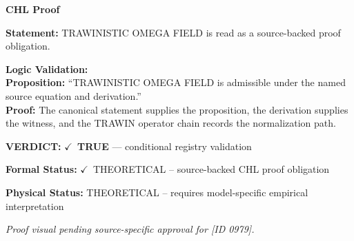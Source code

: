 \vspace{0.45em}
\noindent\textbf{CHL Proof}\par
\textbf{Statement:} TRAWINISTIC OMEGA FIELD is read as a source-backed proof obligation.

\textbf{Logic Validation:}\\
\textbf{Proposition:} ``TRAWINISTIC OMEGA FIELD is admissible under the named source equation and derivation.''\\
\textbf{Proof:} The canonical statement supplies the proposition, the derivation supplies the witness, and the TRAWIN operator chain records the normalization path.

\textbf{VERDICT:} \ensuremath{\checkmark}\ \textbf{TRUE} --- conditional registry validation

\textbf{Formal Status:} \ensuremath{\checkmark}\ THEORETICAL -- source-backed CHL proof obligation

\textbf{Physical Status:} THEORETICAL -- requires model-specific empirical interpretation
\par\vspace{0.45em}
\par
\vfill
\begingroup\footnotesize\itshape
Proof visual pending source-specific approval for [ID 0979].
\par\endgroup
\vfill
\endgroup
\endgroup
